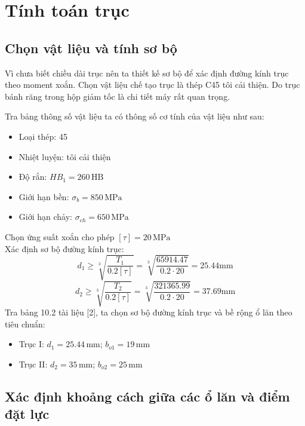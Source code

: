 \chapter{Tính toán trục}
\section{Chọn vật liệu và tính sơ bộ}
Vì chưa biết chiều dài trục nên ta thiết kế sơ bộ để xác định đường kính trục theo moment xoắn. 
Chọn vật liệu chế tạo trục là thép C45 tôi cải thiện. Do trục bánh răng trong hộp giảm tốc là chi tiết máy rất quan trọng.

Tra bảng thông số vật liệu ta có thông số cơ tính của vật liệu như sau:
\begin{itemize}
    \item Loại thép: 45
    \item Nhiệt luyện: tôi cải thiện
    \item Độ rắn: $HB_1 = 260 \, \text{HB}$
    \item Giới hạn bền: $\sigma_b = 850 \, \text{MPa}$
    \item Giới hạn chảy: $\sigma_{ch} = 650 \, \text{MPa}$
\end{itemize}
Chọn ứng suất xoắn cho phép $[\tau] = 20 \, \text{MPa}$ \\
Xác định sơ bộ đường kính trục:
\begin{equation}
d_1 \geq \sqrt[3]{\frac{T_1}{0.2[\tau]}} = \sqrt[3]{\frac{65914.47}{0.2 \cdot 20}} = 25.44 \text{mm}
\end{equation}
\begin{equation}
d_2 \geq \sqrt[3]{\frac{T_2}{0.2[\tau]}} = \sqrt[3]{\frac{321365.99}{0.2 \cdot 20}} = 37.69 \text{mm}
\end{equation}
Tra bảng 10.2 tài liệu [2], ta chọn sơ bộ đường kính trục và bề rộng ổ lăn theo tiêu chuẩn:
\begin{itemize}
    \item Trục I: $d_1 = 25.44 \, \text{mm}$; $b_{o1} = 19 \, \text{mm}$
    \item Trục II: $d_2 = 35 \, \text{mm}$; $b_{o2} = 25 \, \text{mm}$  
\end{itemize}
\section{Xác định khoảng cách giữa các ổ lăn và điểm đặt lực}
